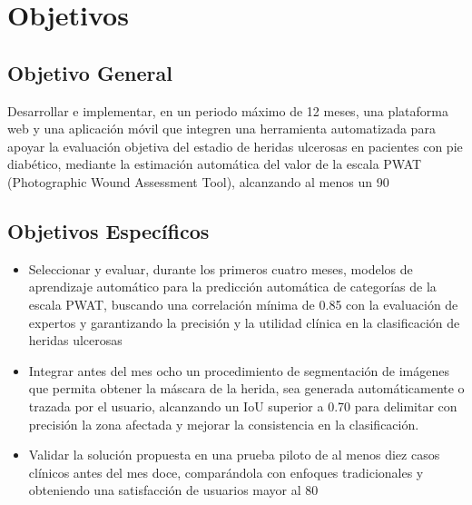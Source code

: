 \section{Objetivos}

\subsection{Objetivo General}
\label{sc:OG}
Desarrollar e implementar, en un periodo máximo de 12 meses, una plataforma web y una aplicación móvil que integren una herramienta automatizada para apoyar la evaluación objetiva del estadio de heridas ulcerosas en pacientes con pie diabético, mediante la estimación automática del valor de la escala PWAT (Photographic Wound Assessment Tool), alcanzando al menos un 90%

\subsection{Objetivos Específicos}
\label{ssc:OE}

\begin{itemize}
    \item Seleccionar y evaluar, durante los primeros cuatro meses, modelos de aprendizaje automático para la predicción automática de categorías de la escala PWAT, buscando una correlación mínima de 0.85 con la evaluación de expertos y garantizando la precisión y la utilidad clínica en la clasificación de heridas ulcerosas
    \item Integrar antes del mes ocho un procedimiento de segmentación de imágenes que permita obtener la máscara de la herida, sea generada automáticamente o trazada por el usuario, alcanzando un IoU superior a 0.70 para delimitar con precisión la zona afectada y mejorar la consistencia en la clasificación.
    \item Validar la solución propuesta en una prueba piloto de al menos diez casos clínicos antes del mes doce, comparándola con enfoques tradicionales y obteniendo una satisfacción de usuarios mayor al 80%
\end{itemize}

